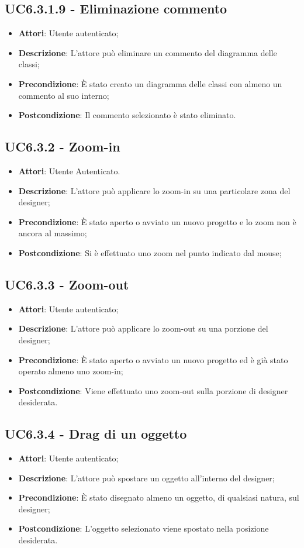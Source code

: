 \subsection{UC6.3.1.9 - Eliminazione commento} 
\label{ssec:UC6.3.1.9} 
\begin{itemize} 
\item \textbf{Attori}: Utente autenticato;
\item \textbf{Descrizione}: L'attore può eliminare un commento del diagramma delle classi;
\item \textbf{Precondizione}: È stato creato un diagramma delle classi con almeno un commento al suo interno;
\item \textbf{Postcondizione}: Il commento selezionato è stato eliminato.
\end{itemize} 
\subsection{UC6.3.2 - Zoom-in} 
\label{ssec:UC6.3.2} 
\begin{itemize} 
\item \textbf{Attori}: Utente Autenticato.
\item \textbf{Descrizione}: L'attore può applicare lo zoom-in su una particolare zona del designer;
\item \textbf{Precondizione}: È stato aperto o avviato un nuovo progetto e lo zoom non è ancora al massimo;
\item \textbf{Postcondizione}: Si è effettuato uno zoom nel punto indicato dal mouse;
\end{itemize} 
\subsection{UC6.3.3 - Zoom-out} 
\label{ssec:UC6.3.3} 
\begin{itemize} 
\item \textbf{Attori}: Utente autenticato;
\item \textbf{Descrizione}: L'attore può applicare lo zoom-out su una porzione del designer;
\item \textbf{Precondizione}: È stato aperto o avviato un nuovo progetto ed è già stato operato almeno uno zoom-in;
\item \textbf{Postcondizione}: Viene effettuato uno zoom-out sulla porzione di designer desiderata.
\end{itemize} 
\subsection{UC6.3.4 - Drag di un oggetto} 
\label{ssec:UC6.3.4} 
\begin{itemize} 
\item \textbf{Attori}: Utente autenticato;
\item \textbf{Descrizione}: L'attore può spostare un oggetto all'interno del designer;
\item \textbf{Precondizione}: È stato disegnato almeno un oggetto, di qualsiasi natura, sul designer;
\item \textbf{Postcondizione}: L'oggetto selezionato viene spostato nella posizione desiderata.
\end{itemize} 
\newpage
